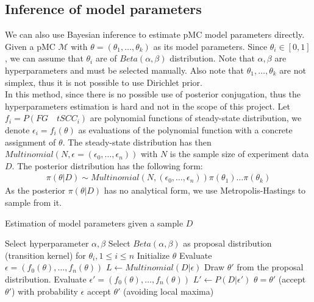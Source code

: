 \documentclass[12pt]{article}
\theoremstyle{definition}
\begin{document}
\subsection{Inference of model parameters}
We can also use Bayesian inference to estimate pMC model parameters directly.
Given a pMC $\mathcal{M}$ with $\theta=(\theta_1,\ldots,\theta_k)$ as its model
parameters. Since $\theta_i \in [0,1]$, we can assume that $\theta_i$ are of
$Beta(\alpha, \beta)$ distribution. Note that $\alpha, \beta$ are
hyperparameters and must be selected manually. Also note that
$\theta_1,\ldots,\theta_k$ are not simplex, thus it is not possible to use
Dirichlet prior. \\
In this method, since there is no possible use of posterior conjugation, thus
the hyperparameters estimation is hard and not in the scope of this project. Let
$f_i = P (FG\quad tSCC_i)$ are polynomial functions of steady-state
distribution, we denote $\epsilon_i = f_i(\theta)$ as evaluations of the
polynomial function with a concrete assignment of $\theta$. The steady-state
distribution has then $Multinomial(N, \epsilon = (\epsilon_0,\ldots,\epsilon_n))$ with $N$
is the sample size of experiment data $D$. The posterior distribution has the
following form:
\begin{align*}
  \pi(\theta|D) \sim Multinomial(N, (\epsilon_0,\ldots,\epsilon_n))\pi(\theta_1)\ldots\pi(\theta_k)
\end{align*}
As the posterior $\pi(\theta|D)$ has no analytical form, we use
Metropolis-Hastings to sample from it.
\begin{algorithm}[H]
  \caption{Estimation of model parameters given a sample $D$}\label{exp_b}
  \begin{algorithmic}[1]
    \State Select hyperparameter $\alpha, \beta$
    \State Select $Beta(\alpha, \beta)$ as proposal distribution (transition
    kernel) for $\theta_i, 1\leq i \leq n$
    \State Initialize $\theta$
    \State Evaluate $\epsilon = (f_0(\theta),\ldots,f_n(\theta))$
    \State $L \leftarrow Multinomial(D|\epsilon)$
    \State Draw $\theta'$ from the proposal distribution.
    \State Evaluate $\epsilon' = (f_0(\theta),\ldots,f_n(\theta))$
    \State $L' \leftarrow P(D|\epsilon')$
    \State  $\theta = \theta'$ (accept $\theta'$)
    \Else
    \State with probability $\epsilon$ accept $\theta'$ (avoiding local maxima)
    \EndIf
    \EndWhile
    \EndProcedure
  \end{algorithmic}
\end{algorithm}
\end{document}
